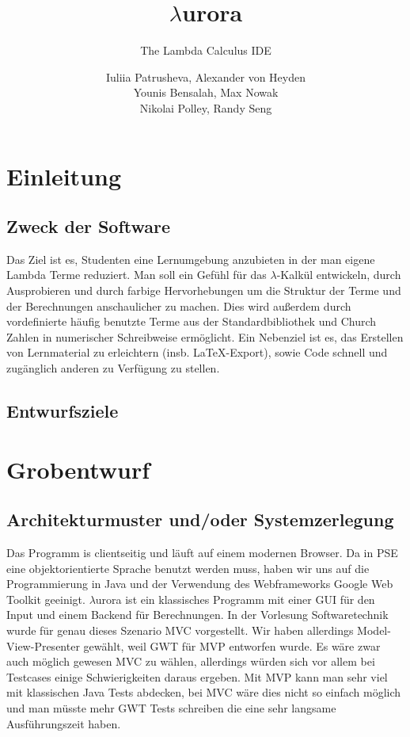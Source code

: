 \documentclass[parskip=full,11pt,twoside]{scrartcl}
\title{$\lambda$urora}
\subtitle{The Lambda Calculus IDE}
\author{Iuliia Patrusheva, Alexander von Heyden\\
Younis Bensalah, Max Nowak\\
Nikolai Polley, Randy Seng}
\begin{document}
\maketitle
\pagebreak
\tableofcontents
\pagebreak
\section{Einleitung}
\subsection{Zweck der Software}
Das Ziel ist es, Studenten eine Lernumgebung anzubieten in der man eigene Lambda Terme reduziert. Man soll ein Gefühl für das $\lambda$-Kalkül entwickeln, durch Ausprobieren
und durch farbige Hervorhebungen um die Struktur der Terme und der Berechnungen anschaulicher zu machen.
Dies wird außerdem durch vordefinierte häufig benutzte Terme aus der Standardbibliothek und Church Zahlen in numerischer Schreibweise ermöglicht.
Ein Nebenziel ist es, das Erstellen von Lernmaterial zu erleichtern (insb. \LaTeX-Export), sowie Code schnell und zugänglich anderen zu Verfügung zu stellen.
\subsection{Entwurfsziele}
\pagebreak

\section{Grobentwurf}
\subsection{Architekturmuster und/oder Systemzerlegung}
Das Programm is clientseitig und läuft auf einem modernen Browser. Da in PSE eine objektorientierte Sprache benutzt werden muss, haben wir uns auf die Programmierung in Java und der Verwendung des Webframeworks Google Web Toolkit geeinigt.
$\lambda$urora ist ein klassisches Programm mit einer GUI für den Input und einem Backend für Berechnungen. In der Vorlesung Softwaretechnik wurde für genau dieses Szenario MVC vorgestellt.
Wir haben allerdings  Model-View-Presenter gewählt, weil GWT für MVP entworfen wurde. Es wäre zwar auch möglich gewesen MVC zu wählen, allerdings würden sich vor allem bei Testcases 
einige Schwierigkeiten daraus ergeben. Mit MVP kann man sehr viel mit klassischen Java Tests abdecken, bei MVC wäre dies nicht so einfach möglich und man müsste mehr GWT Tests schreiben die eine sehr langsame Ausführungszeit haben. 
\end{document}
